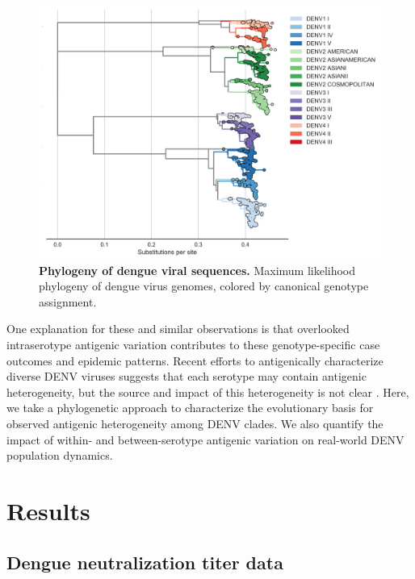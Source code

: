 \documentclass[11pt,oneside,letterpaper]{article}
\begin{document}
\begin{figure}[h]
  \begin{centering}
    \includegraphics[width=\linewidth]{../figures/png/genotype_tree.png}
  	\caption{\textbf{Phylogeny of dengue viral sequences.}
    Maximum likelihood phylogeny of dengue virus genomes, colored by canonical genotype assignment.
    }
  	\label{genotype_tree}
  \end{centering}
\end{figure}

One explanation for these and similar observations is that overlooked intraserotype antigenic variation contributes to these genotype-specific case outcomes and epidemic patterns.
Recent efforts to antigenically characterize diverse DENV viruses suggests that each serotype may contain antigenic heterogeneity, but the source and impact of this heterogeneity is not clear \citep{katzelnick2015dengue}.
Here, we take a phylogenetic approach to characterize the evolutionary basis for observed antigenic heterogeneity among DENV clades.
We also quantify the impact of within- and between-serotype antigenic variation on real-world DENV population dynamics.

\section*{Results}

\subsection*{Dengue neutralization titer data}
\end{document}
